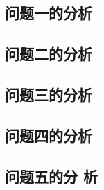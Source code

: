 \documentclass[../main.tex]{subfiles}
\begin{document}
\subsection{问题一的分析}



\subsection{问题二的分析}




\subsection{问题三的分析}




\subsection{问题四的分析}




\subsection{问题五的分
析}  
\end{document}
